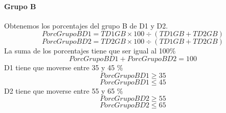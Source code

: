 \paragraph{Grupo B} Obtenemos los porcentajes del grupo B de D1 y D2.  
\begin{equation}
PorcGrupoBD1 = TD1GB \times 100 \div (TD1GB + TD2GB)
\end{equation}
\begin{equation}
PorcGrupoBD2 = TD2GB \times 100 \div (TD1GB + TD2GB)
\end{equation}
La suma de los porcentajes tiene que ser igual al 100\%
\begin{equation}
PorcGrupoBD1 + PorcGrupoBD2 = 100
\end{equation}
D1 tiene que moverse entre 35 y 45 \%
\begin{equation}
PorcGrupoBD1 \geq 35
\end{equation}
\begin{equation}
PorcGrupoBD1 \leq 45
\end{equation}
D2 tiene que moverse entre 55 y 65 \%
\begin{equation}
PorcGrupoBD2 \geq 55
\end{equation}
\begin{equation}
PorcGrupoBD2 \leq 65
\end{equation}
